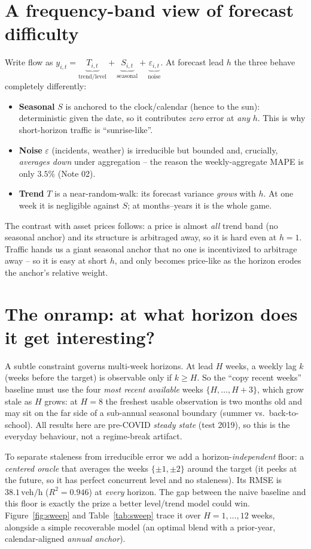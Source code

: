 \documentclass[11pt]{article}
\newcommand{\veh}{\,\text{veh/h}}
\begin{document}
\section{A frequency-band view of forecast difficulty}
Write flow as $y_{i,t} = \underbrace{T_{i,t}}_{\text{trend/level}} +
\underbrace{S_{i,t}}_{\text{seasonal}} + \underbrace{\varepsilon_{i,t}}_{\text{noise}}$.
At forecast lead $h$ the three behave completely differently:
\begin{itemize}
\item \textbf{Seasonal} $S$ is anchored to the clock/calendar (hence to the sun):
  deterministic given the date, so it contributes \emph{zero} error at \emph{any}
  $h$. This is why short-horizon traffic is ``sunrise-like''.
\item \textbf{Noise} $\varepsilon$ (incidents, weather) is irreducible but bounded
  and, crucially, \emph{averages down} under aggregation -- the reason the
  weekly-aggregate MAPE is only $3.5\%$ (Note 02).
\item \textbf{Trend} $T$ is a near-random-walk: its forecast variance \emph{grows}
  with $h$. At one week it is negligible against $S$; at months--years it is the
  whole game.
\end{itemize}
The contrast with asset prices follows: a price is almost \emph{all} trend band
(no seasonal anchor) and its structure is arbitraged away, so it is hard even at
$h{=}1$. Traffic hands us a giant seasonal anchor that no one is incentivized to
arbitrage away -- so it is easy at short $h$, and only becomes price-like as the
horizon erodes the anchor's relative weight.

\section{The onramp: at what horizon does it get interesting?}
\label{sec:onramp}
A subtle constraint governs multi-week horizons. At lead $H$ weeks, a weekly lag
$k$ (weeks before the target) is observable only if $k\ge H$. So the ``copy recent
weeks'' baseline must use the four \emph{most recent available} weeks
$\{H,\dots,H+3\}$, which grow stale as $H$ grows: at $H{=}8$ the freshest usable
observation is two months old and may sit on the far side of a sub-annual
seasonal boundary (summer vs.\ back-to-school). All results here are pre-COVID
\emph{steady state} (test 2019), so this is the everyday behaviour, not a
regime-break artifact.

To separate staleness from irreducible error we add a horizon-\emph{independent}
floor: a \emph{centered oracle} that averages the weeks $\{\pm1,\pm2\}$ around the
target (it peeks at the future, so it has perfect concurrent level and no
staleness). Its RMSE is $38.1\veh$ ($R^2{=}0.946$) at \emph{every} horizon. The
gap between the naive baseline and this floor is exactly the prize a better
level/trend model could win. Figure~\ref{fig:sweep} and Table~\ref{tab:sweep}
trace it over $H=1,\dots,12$ weeks, alongside a simple recoverable model (an
optimal blend with a prior-year, calendar-aligned \emph{annual anchor}).
\end{document}
